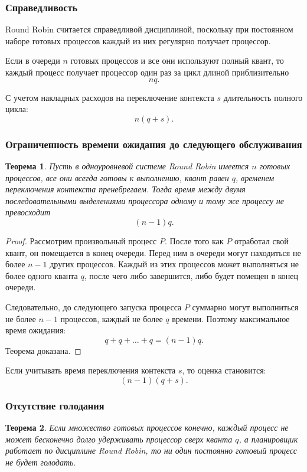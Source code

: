 \documentclass[12pt,a4paper]{article}
\newtheorem{theorem}{Теорема}
\begin{document}
\subsubsection{Справедливость}

Round Robin считается справедливой дисциплиной, поскольку при постоянном наборе готовых процессов каждый из них регулярно получает процессор.

Если в очереди $n$ готовых процессов и все они используют полный квант, то каждый процесс получает процессор один раз за цикл длиной приблизительно
\[
nq.
\]

С учетом накладных расходов на переключение контекста $s$ длительность полного цикла:
\[
n(q+s).
\]

\subsubsection{Ограниченность времени ожидания до следующего обслуживания}

\begin{theorem}
Пусть в одноуровневой системе Round Robin имеется $n$ готовых процессов, все они всегда готовы к выполнению, квант равен $q$, временем переключения контекста пренебрегаем. Тогда время между двумя последовательными выделениями процессора одному и тому же процессу не превосходит
\[
(n-1)q.
\]
\end{theorem}

\begin{proof}
Рассмотрим произвольный процесс $P$. После того как $P$ отработал свой квант, он помещается в конец очереди. Перед ним в очереди могут находиться не более $n-1$ других процессов. Каждый из этих процессов может выполняться не более одного кванта $q$, после чего либо завершится, либо будет помещен в конец очереди.

Следовательно, до следующего запуска процесса $P$ суммарно могут выполниться не более $n-1$ процессов, каждый не более $q$ времени. Поэтому максимальное время ожидания:
\[
q + q + \ldots + q = (n-1)q.
\]
Теорема доказана.
\end{proof}

Если учитывать время переключения контекста $s$, то оценка становится:
\[
(n-1)(q+s).
\]

\subsubsection{Отсутствие голодания}

\begin{theorem}
Если множество готовых процессов конечно, каждый процесс не может бесконечно долго удерживать процессор сверх кванта $q$, а планировщик работает по дисциплине Round Robin, то ни один постоянно готовый процесс не будет голодать.
\end{theorem}
\end{document}
